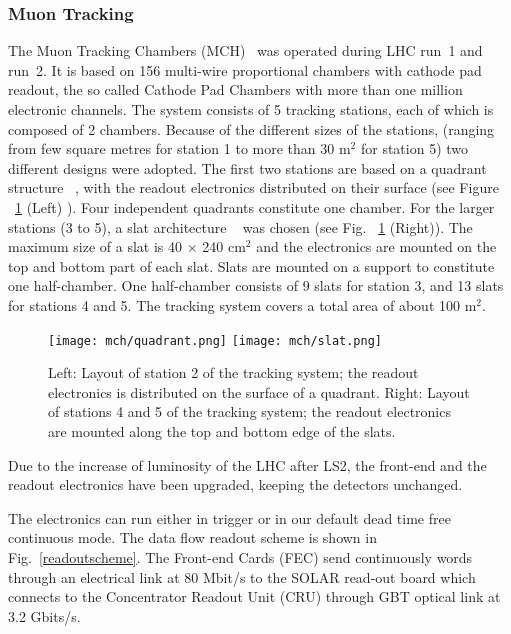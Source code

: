 \subsubsection{Muon Tracking}

The Muon Tracking Chambers (MCH)~\cite{Aamodt:2008zz} was operated
during LHC run~1 and run~2. It is based on 156 multi-wire proportional
chambers with cathode pad readout, the so called Cathode Pad Chambers with more than
one million electronic channels. 
The system consists of 5 tracking stations, each of which is composed of 2
chambers. Because of the different sizes of the stations, (ranging from few square metres for station 1 to more than 30 m$^{2}$  for station 5) two different designs were adopted. The first two stations are based on a quadrant structure ~\cite{Peyre}, with the readout
  electronics distributed on their surface (see Figure ~\ref{quad+slat} (Left) ). Four independent quadrants constitute one chamber. For the larger stations (3 to 5), a slat architecture ~\cite{Cicalo} was chosen (see Fig. ~\ref{quad+slat} (Right)). The maximum
  size of a slat is 40 $\times$ 240 cm$^{2}$ and the electronics are mounted on the top and bottom part of
  each slat. Slats are mounted on a support to constitute one
  half-chamber. One half-chamber consists of 9 slats for station 3,
  and 13 slats for stations 4 and 5. The tracking system
  covers a total area of about 100 m$^{2}$. 

\begin{figure}[h]
  \centering
  \texttt{[image: mch/quadrant.png]}
  \hspace{0.05\textwidth}
  \texttt{[image: mch/slat.png]}
   \caption[Tracking system layout]{Left: Layout of station 2 of the tracking system; the readout electronics is distributed on the surface of a quadrant. Right: Layout of stations 4 and 5 of the tracking system; the readout electronics are mounted along the top and bottom edge of the slats.}
  \label{quad+slat}
\end{figure}

Due to the increase of luminosity of the LHC after LS2, the front-end
and the readout electronics have been upgraded, keeping the detectors
unchanged.

The electronics can run either in trigger or in our default dead time free continuous
mode. The data flow readout scheme is shown in
Fig.~\ref{readoutscheme}. The Front-end Cards (FEC) send continuously words through an electrical link at 80 Mbit/s to the SOLAR
read-out board which connects to the Concentrator Readout Unit (CRU)
through GBT optical link at 3.2 Gbits/s.

